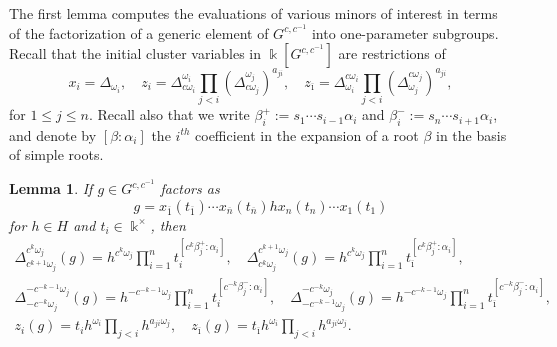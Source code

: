 \documentclass[12pt]{amsart}
\newcommand{\kk}{\Bbbk}
\newcommand{\ol}[1]{\overline{#1}}
\newcommand{\cvar}{z}
\newtheorem{lemma}[theorem]{Lemma}
\theoremstyle{remark}
\numberwithin{equation}{section}
\numberwithin{figure}{section}
\begin{document}
The first lemma computes the evaluations of various minors of interest in terms of the factorization of a generic element of $G^{c,c^{-1}}$ into one-parameter subgroups.
Recall that the initial cluster variables in $\kk[G^{c,c^{-1}}]$ are restrictions of
\[
  x_i = \Delta_{\omega_i},
  \quad
  \cvar_i = \Delta^{\omega_i}_{ c\omega_i} \prod_{j < i}(\Delta^{\omega_j}_{c \omega_j})^{a_{ji}},
  \quad
  \cvar_{\ol{\imath}} = \Delta^{c \omega_i}_{\omega_i} \prod_{j < i}(\Delta^{c \omega_j}_{\omega_j})^{a_{ji}},
\]
for $1 \leq j \leq n$. Recall also that we write $\beta_i^+:=s_1\cdots s_{i-1}\alpha_i$ and $\beta_i^-:=s_n\cdots s_{i+1}\alpha_i$, and denote by $[\beta:\alpha_i]$ the $i^{th}$ coefficient in the expansion of a root $\beta$ in the basis of simple roots.

\begin{lemma}
  \label{lemma:coefficients_values}
  If $g \in G^{c,c^{-1}}$ factors as
  \begin{equation}
    \label{eq:generic_factorization}
    g = x_{\ol{1}}(t_{\ol{1}}) \cdots x_{\ol{n}}(t_{\ol{n}}) h x_n(t_n) \cdots x_1(t_1)
  \end{equation}
  for $h \in H$ and $t_i \in \kk^\times$, then
  \begin{gather}
    \Delta^{c^k\omega_j}_{c^{k+1}\omega_j}(g) = h^{c^k\omega_j}\prod_{i=1}^n t_{i}^{[c^k\beta_j^+:\alpha_i]},
    \quad
    \Delta^{c^{k+1}\omega_j}_{c^k\omega_j}(g) = h^{c^k\omega_j}\prod_{i=1}^n t_{\ol{\imath}}^{[c^k\beta_j^+:\alpha_i]},
    \label{eq:positive_cminor_values}\\
    \Delta^{-c^{-k-1}\omega_j}_{-c^{-k}\omega_j}(g) = h^{-c^{-k-1}\omega_j}\prod_{i=1}^n t_{i}^{[c^{-k}\beta_j^-:\alpha_i]},
    \quad
    \Delta^{-c^{-k}\omega_j}_{-c^{-k-1}\omega_j}(g) = h^{-c^{-k-1}\omega_j}\prod_{i=1}^n t_{\ol{\imath}}^{[c^{-k}\beta_j^-:\alpha_i]},
    \label{eq:negative_cminor_values}\\
    \cvar_i(g) = t_i h^{\omega_i}\prod_{ j <i}h^{a_{ j  i}\omega_ j },
    \quad
    \cvar_{\ol{\imath}}(g) = t_{\ol{\imath}} h^{\omega_i}\prod_{ j <i}h^{a_{ j  i}\omega_ j }.
    \label{eq:frozen_values}
  \end{gather}
\end{lemma}
\end{document}
